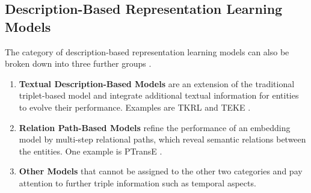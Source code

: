 \subsection{Description-Based Representation Learning Models}
\label{subsec:description_based_representation_learning_models}

The category of description-based representation learning models can also be broken down into three further groups \cite{electronics9050750}.
\begin{enumerate}
    \item 
    \textbf{Textual Description-Based Models} are an extension of the traditional triplet-based model and integrate additional textual information for entities to evolve their performance.
    Examples are \ac{TKRL} \cite{TKRL} and \ac{TEKE} \cite{TEKE}.
    
    \item 
    \textbf{Relation Path-Based Models} refine the performance of an embedding model by multi-step relational paths, which reveal semantic relations between the entities.
    One example is \ac{PTransE} \cite{PTransE}.
    
    \item 
    \textbf{Other Models} that cannot be assigned to the other two categories and pay attention to further triple information such as temporal aspects.
\end{enumerate}